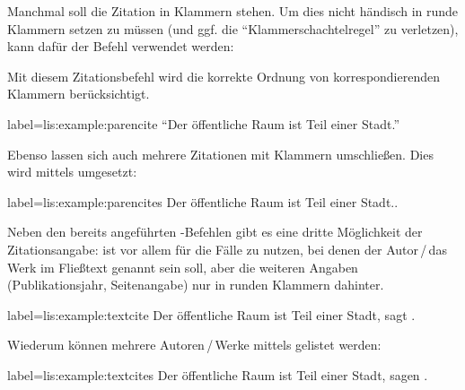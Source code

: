 Manchmal soll die Zitation in Klammern stehen.
Um dies nicht händisch in runde Klammern setzen zu müssen (und ggf. die \enquote{Klammerschachtelregel} zu verletzen),
kann dafür der Befehl   verwendet werden:
Mit diesem Zitationsbefehl wird die korrekte Ordnung von korrespondierenden Klammern berücksichtigt.
\begin{lfgwexample}{label={lis:example:parencite}}
\enquote{Der öffentliche Raum ist Teil einer Stadt.} \parencite{Osland2016}
\end{lfgwexample}

Ebenso lassen sich auch mehrere Zitationen mit Klammern umschließen.
Dies wird mittels  umgesetzt:
\begin{lfgwexample}{label={lis:example:parencites}}
Der öffentliche Raum ist Teil einer Stadt.\parencites(s.)(){Osland2016}%
[vgl.][]{Evangelidis2014}.
\end{lfgwexample}

Neben den bereits angeführten -Befehlen gibt es eine dritte Möglichkeit der Zitationsangabe:
 ist vor allem für die Fälle zu nutzen, 
bei denen der Autor\,/\,das Werk im Fließtext genannt sein soll, 
aber die weiteren Angaben (Publikationsjahr, Seitenangabe) nur in runden Klammern dahinter.

\begin{lfgwexample}{label={lis:example:textcite}}
Der öffentliche Raum ist Teil einer Stadt, sagt \textcite{Osland2016}.
\end{lfgwexample}

Wiederum können mehrere Autoren\,/\,Werke mittels  gelistet werden:
\begin{lfgwexample}{label={lis:example:textcites}}
Der öffentliche Raum ist Teil einer Stadt, sagen \textcites{Osland2016}%
[vgl.][]{Evangelidis2014}.
\end{lfgwexample}


